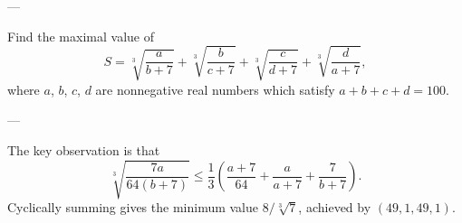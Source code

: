 
---

Find the maximal value of \[S=\sqrt[3]{\frac a{b+7}}+\sqrt[3]{\frac b{c+7}}+\sqrt[3]{\frac c{d+7}}+\sqrt[3]{\frac d{a+7}},\]
where $a$, $b$, $c$, $d$ are nonnegative real numbers which satisfy $a+b+c+d=100$.

---

The key observation is that \[\sqrt[3]{\frac{7a}{64(b+7)}}\le\frac13\left(\frac{a+7}{64}+\frac a{a+7}+\frac7{b+7}\right).\]
Cyclically summing gives the minimum value $8/\sqrt[3]7$, achieved by $(49,1,49,1)$.

